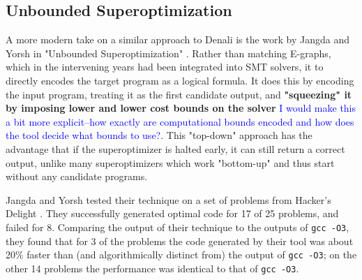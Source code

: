 \documentclass[12pt,twoside]{reedthesis}
\newcommand{\comment}[2]{\textbf{#1} \textcolor{blue}{#2}}
\begin{document}
        \subsection{Unbounded Superoptimization}
            A more modern take on a similar approach to Denali is the work by Jangda and Yorsh in "Unbounded Superoptimization" \cite{jangda2017unbounded}.
            Rather than matching E-graphs, which in the intervening years had been integrated into SMT solvers, it to directly encodes the target program as a logical formula.
            It does this by encoding the input program, treating it as the first candidate output, and
                \comment{"squeezing" it by imposing lower and lower cost bounds on the solver}{I would make this a bit more explicit--how exactly are computational bounds encoded and how does the tool decide what bounds to use?}.
            This "top-down" approach has the advantage that if the superoptimizer is halted early, it can still return a correct output, unlike many superoptimizers which work "bottom-up" and thus start without any candidate programs.

            Jangda and Yorsh tested their technique on a set of problems from Hacker's Delight \cite{warren2013hackers}.
            They successfully generated optimal code for 17 of 25 problems, and failed for 8.
            Comparing the output of their technique to the outputs of \texttt{gcc -O3}\footnotemark, they found that for 3 of the problems the code generated by their tool was about 20\% faster than (and algorithmically distinct from) the output of \texttt{gcc -O3}; on the other 14 problems the performance was identical to that of \texttt{gcc -O3}.

\end{document}
